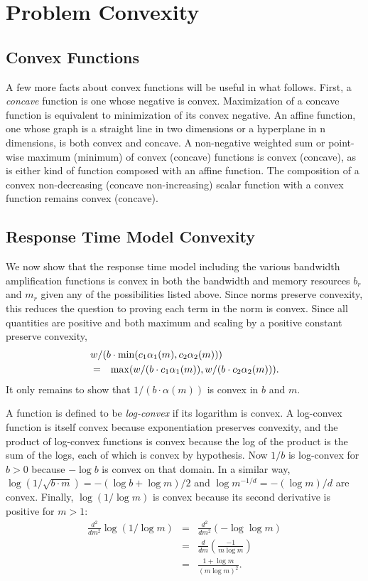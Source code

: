 \section{Problem Convexity}\label{convex}

\subsection*{Convex Functions}
A few more facts about convex functions will be useful in what follows.
First, a \emph{concave} function is one whose negative is convex.
Maximization of a concave function is equivalent to minimization of its convex negative.
An affine function, one whose graph is a straight line in two dimensions or a hyperplane in n dimensions,
is both convex and concave.  A non-negative weighted sum or point-wise maximum (minimum) of convex (concave) functions is convex (concave), as is either kind of function composed with an affine function.  The composition of a convex non-decreasing (concave non-increasing) scalar function with a convex function remains convex (concave).

\subsection*{Response Time Model Convexity}

We now show that the response time model including the various bandwidth amplification functions is convex
in both the bandwidth and memory resources $b_r$ and $m_r$ given any of the possibilities listed above.
Since norms preserve convexity, this reduces the question to proving each term in the norm is convex.
Since all quantities are positive and both maximum and scaling by a positive constant preserve convexity,
\begin{eqnarray*}
\lefteqn{w/(b\cdot\min(c_1\alpha_1(m),c_2\alpha_2(m)))}   \\
&=& \max(w/(b\cdot c_1\alpha_1(m)),w/(b\cdot c_2\alpha_2(m))).
\end{eqnarray*}
It only remains to show that $1/(b\cdot\alpha(m))$ is convex in $b$ and $m$.

A function is defined to be \emph{log-convex} if its logarithm is convex.
A log-convex function is itself convex because exponentiation preserves convexity,
and the product of log-convex functions is convex because the log of the product is the sum of the logs,
each of which is convex by hypothesis.
Now $1/b$ is log-convex for $b > 0$ because $-\log b$ is convex on that domain.
In a similar way, $\log(1/\sqrt{b\cdot m}) = -(\log b + \log m)/2$
and $\log m^{-1/d} = -(\log m)/d$ are convex.
Finally, $\log (1/\log m)$ is convex because its second derivative is positive for $m > 1$:
\begin{eqnarray*}
\frac{d^2}{dm^2}\log (1/\log m) &=& \frac{d^2}{dm^2}(-\log\log m)  \\
                                  &=& \frac{d}{dm}\left(\frac{-1}{m\log m}\right) \\
                                  &=& \frac{1 + \log m}{(m\log m)^2}.
\end{eqnarray*}

